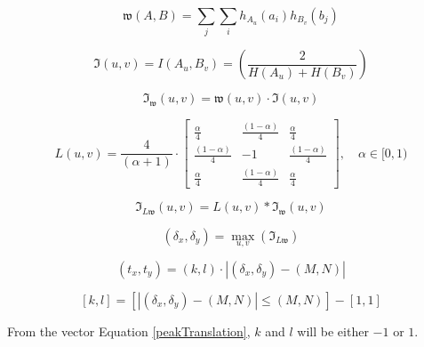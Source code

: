 \begin{equation}
\label{}
\mathfrak{w}(A,B)=\sum_{j}\sum_{i}{h_{A_{u}}(a_{i})h_{B_{v}}(b_{j})}
\end{equation}

\begin{equation}
\label{}
\mathfrak{I}(u,v)=I(A_{u},B_{v})=\left(\frac{2}{H(A_{u})+H(B_{v})}\right)
\end{equation}


\begin{equation}
\label{WeightedInformation}
	\mathfrak{I}_{\mathfrak{w}}(u,v)=\mathfrak{w}(u,v) \cdot \mathfrak{I}(u,v)
\end{equation}


\begin{equation}
\label{laplacianFilter}
	L(u,v)=\frac{4}{(\alpha + 1)} \cdot
	\begin{bmatrix}
		\frac{\alpha}{4} & \frac{(1-\alpha)}{4} & \frac{\alpha}{4} \\
		\frac{(1-\alpha)}{4} & -1 & \frac{(1-\alpha)}{4} \\
		\frac{\alpha}{4} & \frac{(1-\alpha)}{4} & \frac{\alpha}{4}
	\end{bmatrix}, \quad \alpha \in [0,1)
\end{equation}

\begin{equation}
\label{FilteredWeightedInformation}
	\mathfrak{I}_{L\mathfrak{w}}(u,v)=L(u,v) \ast \mathfrak{I}_{\mathfrak{w}}(u,v)
\end{equation}

\begin{equation}
\label{peakLocation}
	(\delta_{x},\delta_{y})=\max_{u,v}\left(\mathfrak{I}_{L\mathfrak{w}}\right)
\end{equation}

\begin{equation}
\label{peakTranslation}
	(t_{x},t_{y})=(k,l) \cdot \left| (\delta_{x},\delta_{y}) - (M,N) \right|
\end{equation}

\begin{equation}
\label{peakTranslation}
	[k,l] = \left[ \left| (\delta_{x},\delta_{y}) - (M,N) \right| \le (M,N) \right] - [1,1]
\end{equation}

From the vector Equation \ref{peakTranslation}, $k$ and $l$ will be either $-1$ or $1$.




